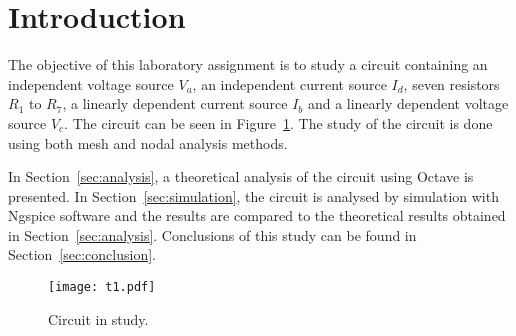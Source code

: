 \section{Introduction}
\label{sec:introduction}

The objective of this laboratory assignment is to study a circuit containing an
independent voltage source $V_a$, an independent current source $I_d$, seven resistors $R_1$ to $R_7$, a linearly dependent current source $I_b$ and a linearly dependent voltage source $V_c$.
The circuit can be seen in Figure~\ref{fig:t1}. The study of the circuit is done using 
both mesh and nodal analysis methods.


In Section~\ref{sec:analysis}, a theoretical analysis of the circuit using Octave is
presented. In Section~\ref{sec:simulation}, the circuit is analysed by
simulation with Ngspice software and the results are compared to the theoretical results obtained in
Section~\ref{sec:analysis}. Conclusions of this study can be found in
Section~\ref{sec:conclusion}.

\begin{figure}[htp] \centering
\texttt{[image: t1.pdf]}
\caption{Circuit in study.}
\label{fig:t1}
\end{figure}
\FloatBarrier

